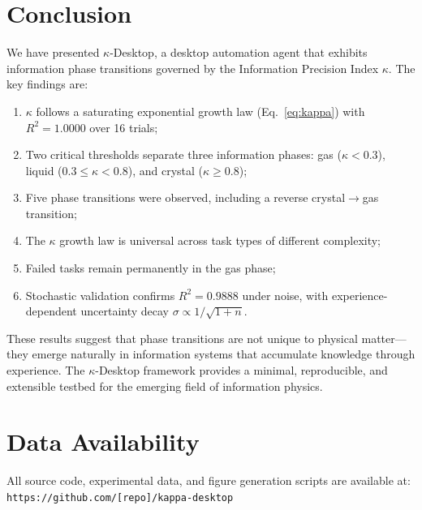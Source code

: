 \documentclass[10pt,twocolumn]{article}
\newcommand{\kap}{\kappa}
\newcommand{\kdes}{$\kappa$-Desktop}
\begin{document}
\section{Conclusion}

We have presented \kdes{}, a desktop automation agent that 
exhibits information phase transitions governed by the 
Information Precision Index $\kap$. The key findings are:

\begin{enumerate}[leftmargin=*, itemsep=2pt]
  \item $\kap$ follows a saturating exponential growth law 
    (Eq.~\ref{eq:kappa}) with $R^2 = 1.0000$ over 16 
    trials;
  \item Two critical thresholds separate three information 
    phases: gas ($\kap < 0.3$), liquid 
    ($0.3 \leq \kap < 0.8$), and crystal ($\kap \geq 0.8$);
  \item Five phase transitions were observed, including 
    a reverse crystal$\to$gas transition;
  \item The $\kap$ growth law is universal across task 
    types of different complexity;
  \item Failed tasks remain permanently in the gas phase;
  \item Stochastic validation confirms $R^2 = 0.9888$ 
    under noise, with experience-dependent uncertainty 
    decay $\sigma \propto 1/\sqrt{1+n}$.
\end{enumerate}

These results suggest that phase transitions are not unique 
to physical matter---they emerge naturally in information 
systems that accumulate knowledge through experience. The 
\kdes{} framework provides a minimal, reproducible, and 
extensible testbed for the emerging field of information 
physics.

\section*{Data Availability}

All source code, experimental data, and figure generation 
scripts are available at: \\
\texttt{https://github.com/[repo]/kappa-desktop}
\end{document}
